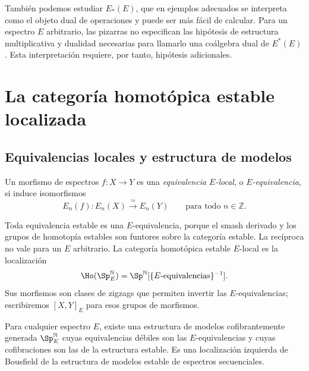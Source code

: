 También podemos estudiar $E_*(E)$, que en ejemplos adecuados se interpreta como el objeto dual de operaciones y puede ser más fácil de calcular. Para un espectro $E$ arbitrario, las pizarras no especifican las hipótesis de estructura multiplicativa y dualidad necesarias para llamarlo una coálgebra dual de $E^*(E)$. Esta interpretación requiere, por tanto, hipótesis adicionales.

\section{La categoría homotópica estable localizada}

\subsection{Equivalencias locales y estructura de modelos}
\begin{defi}\label{defi:c21-equivalencia-local}
Un morfismo de espectros $f\colon X\to Y$ es una \emph{equivalencia $E$-local}, o \emph{$E$-equivalencia}, si induce isomorfismos
\[
E_n(f)\colon E_n(X)\xrightarrow{\ \simeq\ }E_n(Y)
\qquad\text{para todo }n\in\mathbb Z.
\]
\end{defi}

Toda equivalencia estable es una $E$-equivalencia, porque el smash derivado y los grupos de homotopía estables son funtores sobre la categoría estable. La recíproca no vale para un $E$ arbitrario. La categoría homotópica estable $E$-local es la localización
\[
\Ho(\Sp_E^{\mathbb N})
=\Sp^{\mathbb N}[\{\text{$E$-equivalencias}\}^{-1}].
\]
Sus morfismos son clases de zigzags que permiten invertir las $E$-equivalencias; escribiremos $[X,Y]_E$ para esos grupos de morfismos.

\begin{teo}\label{teo:c21-modelos-locales}
Para cualquier espectro $E$, existe una estructura de modelos cofibrantemente generada $\Sp_E^{\mathbb N}$ cuyas equivalencias débiles son las $E$-equivalencias y cuyas cofibraciones son las de la estructura estable. Es una localización izquierda de Bousfield de la estructura de modelos estable de espectros secuenciales.
\end{teo}

